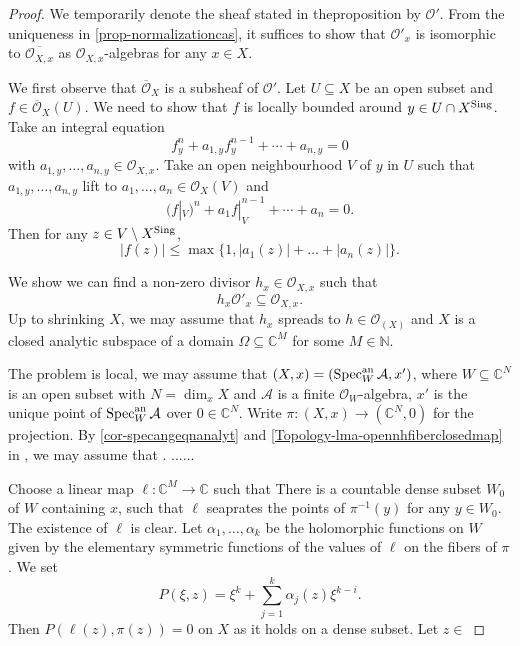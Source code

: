 \begin{proof}
    We temporarily denote the sheaf stated in theproposition by $\mathcal{O}'$. From the uniqueness in \cref{prop-normalizationcas}, it suffices to show that $\mathcal{O}'_{x}$ is isomorphic to $\overline{\mathcal{O}_{X,x}}$ as $\mathcal{O}_{X,x}$-algebras for any $x\in X$.

    We first observe that $\overline{\mathcal{O}}_X$ is a subsheaf of  $\mathcal{O}'$. Let $U\subseteq X$ be an open subset and $f\in \overline{\mathcal{O}}_X(U)$.  We need to show that $f$ is locally bounded around $y\in U\cap X^{\operatorname{Sing}}$. 
    Take an integral equation
    \[
        f_y^n+a_{1,y}f_y^{n-1}+\cdots+a_{n,y}=0  
    \]
    with $a_{1,y},\ldots,a_{n,y}\in \mathcal{O}_{X,x}$.
    Take an open neighbourhood $V$ of $y$ in $U$ such that $a_{1,y},\ldots,a_{n,y}$ lift to $a_1,\ldots,a_n\in \mathcal{O}_X(V)$ and
    \[
        (f|_V)^n +a_1f|_V^{n-1}+\cdots+ a_n=0. 
    \] 
    Then for any $z\in V\setminus X^{\operatorname{Sing}}$,
    \[
        |f(z)|\leq \max\{1,|a_1(z)|+\ldots+|a_n(z)|\}.  
    \]

    We show we can find a non-zero divisor $h_x\in \mathcal{O}_{X,x}$ such that 
    \[
        h_x\mathcal{O}'_x\subseteq \mathcal{O}_{X,x}.  
    \]
    Up to shrinking $X$, we may assume that $h_x$ spreads to $h\in \mathcal{O}_(X)$ and $X$ is a closed analytic subspace of a domain $\Omega \subseteq \mathbb{C}^M$ for some $M\in \mathbb{N}$. 

    The problem is local, we may assume that $(X,x)=(\operatorname{Spec}_{W}^{\mathrm{an}}\mathcal{A},x')$, where $W\subseteq \mathbb{C}^N$ is an open subset with $N=\dim_x X$ and $\mathcal{A}$ is a finite $\mathcal{O}_W$-algebra, $x'$ is the unique point of $\operatorname{Spec}_{W}^{\mathrm{an}}\mathcal{A}$ over $0\in \mathbb{C}^N$. Write $\pi:(X,x)\rightarrow (\mathbb{C}^N,0)$ for the projection. By \cref{cor-specangeqnanalyt} and \cref{Topology-lma-opennhfiberclosedmap} in , we may assume that 
    . ......



    
    Choose a linear map $\ell:\mathbb{C}^M\rightarrow \mathbb{C}$ such that 
    There is a countable dense subset $W_0$ of $W$ containing $x$, such that $\ell$ seaprates the points of $\pi^{-1}(y)$ for any $y\in W_0$. The existence of $\ell$ is clear. Let $\alpha_1,\ldots,\alpha_k$ be the holomorphic functions on $W$ given by the elementary symmetric functions of the values of $\ell$ on the fibers of $\pi$. We set
    \[
        P(\xi,z)=\xi^k+\sum_{j=1}^k \alpha_j(z)\xi^{k-i}.  
    \]
    Then $P(\ell(z),\pi(z))=0$ on $X$ as it holds on a dense subset. Let $z\in $

\end{proof}

